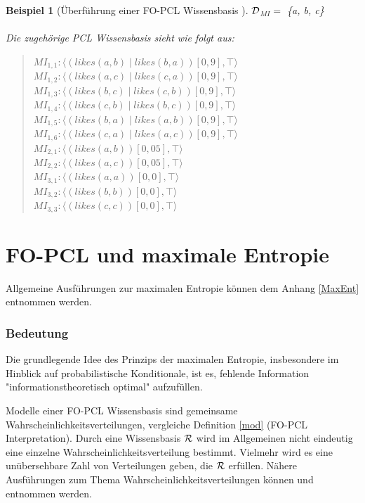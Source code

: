 \documentclass[a4paper, 11pt]{book}
\newtheorem{Bsp}{Beispiel}[section]
\begin{document}
\begin{Bsp}[Überführung einer FO-PCL Wissensbasis ]
	$ \cal{D} $$_{MI}  =$ \{a, b, c\} \\
	\\
	Die zugehörige PCL Wissensbasis sieht wie folgt aus:
	\begin{quote}
	$ MI_{1,1}: \langle (likes(a, b) \mid likes(b, a))[0,9], \top \rangle $\\
	$ MI_{1,2} : \langle (likes(a, c) \mid likes(c, a))[0,9], \top \rangle$\\
	$ MI_{1,3}: \langle (likes(b, c) \mid likes(c, b))[0,9], \top \rangle $\\
	$ MI_{1,4} : \langle (likes(c, b) \mid likes(b, c))[0,9], \top \rangle$\\
	$ MI_{1,5} : \langle (likes(b, a) \mid likes(a, b))[0,9], \top \rangle$\\
	$ MI_{1,6} : \langle (likes(c, a) \mid likes(a, c))[0,9], \top \rangle$\\		
	$ MI_{2,1} : \langle (likes(a, b))[0,05], \top \rangle$\\
	$ MI_{2,2} : \langle (likes(a, c))[0,05], \top \rangle$\\
	$ MI_{3,1} : \langle (likes(a, a))[0,0], \top \rangle$\\
	$ MI_{3,2} : \langle (likes(b, b))[0,0], \top \rangle$\\
	$ MI_{3,3} : \langle (likes(c, c))[0,0], \top \rangle$\\

	\end{quote}

	
\end{Bsp}

\section{FO-PCL und maximale Entropie}   \label{Fo-PCL-MaxEnt}
Allgemeine Ausführungen zur maximalen Entropie können dem Anhang \ref{MaxEnt} entnommen werden.
\subsubsection{Bedeutung}

Die grundlegende Idee des Prinzips der maximalen Entropie, insbesondere im Hinblick auf probabilistische Konditionale, ist es, fehlende Information "{}informationstheoretisch optimal"{} aufzufüllen.

Modelle einer FO-PCL Wissensbasis  sind gemeinsame Wahrscheinlichkeitsverteilungen, vergleiche Definition \ref{mod} (FO-PCL Interpretation).
Durch eine Wissensbasis $ \cal R $ wird im Allgemeinen nicht eindeutig eine einzelne Wahrscheinlichkeitsverteilung bestimmt. Vielmehr wird es eine unübersehbare Zahl von Verteilungen geben, die $ \cal R $ erfüllen.
Nähere Ausführungen zum Thema Wahrscheinlichkeitsverteilungen können \cite[Anhang A, S. 437ff]{BKI08} und \cite[Kap. 5, S. 14ff]{Fis10} entnommen werden.
\end{document}
